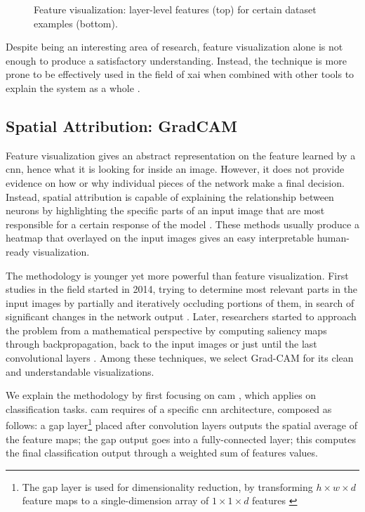 \begin{figure}[!htb]
\begin{center}
\begin{subfigure}[h]{0.23\textwidth}
		\end{subfigure}
	\end{center}
	\vspace{-0.5cm}
	\caption[Feature visualization: layer-level features for certain dataset example]{Feature visualization: layer-level features (top) for certain dataset examples (bottom).}
	\label{fig:feature-visual-1}
\end{figure}

Despite being an interesting area of research, feature visualization alone is not enough to produce a satisfactory understanding. Instead, the technique is more prone to be effectively used in the field of \gls{xai} when combined with other tools to explain the system as a whole \cite{zurowietz2020intvis} \cite{olah2018the}.



\clearpage
\subsection{Spatial Attribution: GradCAM}
\label{subsec:gradcam-theory}

Feature visualization gives an abstract representation on the feature learned by a \gls{cnn}, hence what it is looking for inside an image. However, it does not provide evidence on how or why individual pieces of the network make a final decision. Instead, spatial attribution is capable of explaining the relationship between neurons by highlighting the specific parts of an input image that are most responsible for a certain response of the model \cite{olah2018the}. These methods usually produce a heatmap that overlayed on the input images gives an easy interpretable human-ready visualization.

The methodology is younger yet more powerful than feature visualization. First studies in the field started in 2014, trying to determine most relevant parts in the input images by partially and iteratively occluding portions of them, in search of significant changes in the network output \cite{zeiler2013visualizing}. Later, researchers started to approach the problem from a mathematical perspective by computing saliency maps through backpropagation, back to the input images \cite{simonyan2014deep} or just until the last convolutional layers \cite{zhou2015learning}. Among these techniques, we select Grad-CAM \cite{Selvaraju_2019} for its clean and understandable visualizations.

\medskip

We explain the methodology by first focusing on \gls{cam} \cite{zhou2015learning}, which applies on classification tasks. \gls{cam} requires of a specific \gls{cnn} architecture, composed as follows: a \gls{gap} layer\footnote{The \gls{gap} layer is used for dimensionality reduction, by transforming $h \times w \times d$ feature maps to a single-dimension array of $1 \times 1 \times d$ features \cite{gap_layers}} placed after convolution layers outputs the spatial average of the feature maps; the \gls{gap} output goes into a fully-connected layer; this computes the final classification output through a weighted sum of features values.

